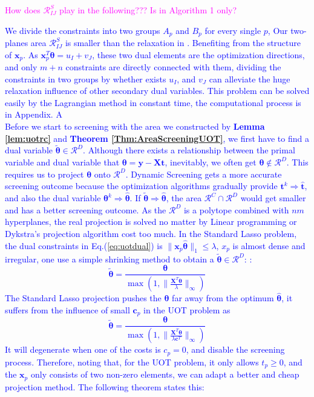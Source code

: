 \documentclass[twoside]{article}
\theoremstyle{plain}
\newcommand{\tranT}{T}
\newcommand{\mat}[1]{\mathbf{#1}}
\renewcommand{\vec}[1]{\bm{#1}}
\newcommand{\changeHK}[1]{\textcolor{red}{#1}}
\newcommand{\changeXS}[1]{\textcolor{blue}{#1}}
\newcommand{\note}[1]{\textcolor{magenta}{#1}}
\begin{document}
\note{How does $\mathcal{R}^{S}_{IJ}$ play in the following??? Is in Algorithm 1 only?}

\changeXS{We divide the constraints into two groups $A_p$ and $B_p$ for every single $p$, Our two-planes area $\mathcal{R}^S_{IJ}$ is smaller than the relaxation in \citep{NEURIPS2021_7b5b23f4}. Benefiting from the structure of $\vec x_p$. As $\vec{x}_p^{\tranT}\vec{\theta} = {u}_{I} + {v}_{J}$, these two dual elements are the optimization directions, and only $m+n$ constraints are directly connected with them, dividing the constraints in two groups by whether exists ${u}_{I}$, and ${v}_{J}$ can alleviate the huge relaxation influence of other secondary dual variables. This problem can be solved easily by the Lagrangian method in constant time, the computational process is in Appendix. A\\
Before we start to screening with the area we constructed by {\bf Lemma \ref{lem:uotrc}} and {\bf Theorem \ref{Thm:AreaScreeningUOT}}, we first have to find a dual variable $\tilde{\vec{\theta}}\in\mathcal{R}^{D}$. Although there exists a relationship between the primal variable and dual variable that $\vec{\theta} = \vec{y} - \mat{X}\vec{t}$, inevitably, we often get $\vec{\theta} \notin \mathcal{R}^{D}$. This requires us to project $\vec{\theta}$ onto $\mathcal{R}^{D}$.  Dynamic Screening gets a more accurate screening outcome because the optimization algorithms gradually provide $\vec t^{k} \Rightarrow \hat{\vec t}$, and also the dual variable $\vec \theta^{k} \Rightarrow \hat{\vec \theta}$. If $\vec{ \tilde{\theta}}\Rightarrow \hat{\vec \theta}$, the area $\mathcal{R}^{C}\cap\mathcal{R}^{D}$ would get smaller and has a better screening outcome. As the $\mathcal{R}^{D}$ is a polytope combined with $nm$ hyperplanes, the real projection is solved no matter by Linear programming or Dykstra's projection algorithm cost too much. In the Standard Lasso problem, the dual constraints in {Eq.(\ref{eq:uotdual})} is $\|\vec{x}_p \hat{\vec{\theta}}\|_1\leq \lambda$, $x_p$ is almost dense and irregular, one use a  simple shrinking method to obtain a $\tilde{\vec{\theta}} \in \mathcal{R}^{D}$:
\changeHK{\cite{xxxxx}}: 
\begin{equation*}
\tilde{\vec{\theta}} = \frac{\vec\theta}{\max(1, \|\frac{\mat{X}^{\tranT}\vec\theta}{\lambda}\|_{\infty})}
\end{equation*}
}
\changeXS{The Standard Lasso projection pushes the $\vec{\theta}$ far away from the optimum $\hat{\vec{\theta}}$, it suffers from the influence of small $\vec c_p$ in the UOT problem as 
$$\tilde{\vec{\theta}} = \frac{\vec\theta}{\max(1, \|\frac{\mat{X}^{\tranT}\vec\theta}{\lambda \vec{c}^{T}}\|_{\infty})}$$ 
It will degenerate when one of the costs is $c_p = 0$, and disable the screening process. Therefore, noting that, for the UOT problem, it only allows $t_p \geq 0$, and the $\vec{x}_p$ only consists of two non-zero elements, we can adapt a better and cheap projection method. The following theorem states this:}
\end{document}
